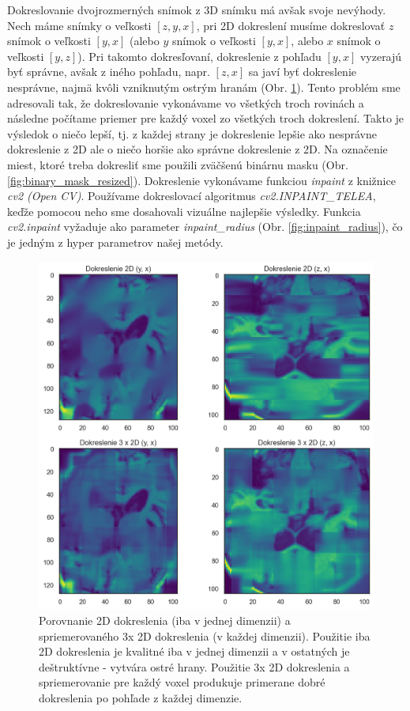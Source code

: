 Dokreslovanie dvojrozmerných snímok z 3D snímku má avšak svoje nevýhody. Nech máme snímky o veľkosti $[z, y, x]$, pri 2D dokreslení musíme dokreslovať $z$ snímok o veľkosti $[y, x]$ (alebo $y$ snímok o veľkosti $[y, x]$, alebo $x$ snímok o veľkosti $[y, z]$). Pri takomto dokresľovaní, dokreslenie z pohľadu $[y, x]$ vyzerajú byť správne, avšak z iného pohľadu, napr. $[z, x]$ sa javí byť dokreslenie nesprávne, najmä kvôli vzniknutým ostrým hranám (Obr. \ref{fig:inpaint_3x_2d}). Tento problém sme adresovali tak, že dokreslovanie vykonávame vo všetkých troch rovinách a následne počítame priemer pre každý voxel zo všetkých troch dokreslení. Takto je výsledok o niečo lepší, tj. z každej strany je dokreslenie lepšie ako nesprávne dokreslenie z 2D ale o niečo horšie ako správne dokreslenie z 2D. Na označenie miest, ktoré treba dokresliť sme použili zväčšenú binárnu masku (Obr. \ref{fig:binary_mask_resized}). Dokreslenie vykonávame funkciou \textit{inpaint} z knižnice \textit{cv2 (Open CV)}. Používame dokreslovací algoritmus \textit{cv2.INPAINT\_TELEA}, keďže pomocou neho sme dosahovali vizuálne najlepšie výsledky. Funkcia \textit{cv2.inpaint} vyžaduje ako parameter \textit{inpaint\_radius} (Obr. \ref{fig:inpaint_radius}), čo je jedným z hyper parametrov našej metódy.

\begin{figure}[H]
    \centering
    \includegraphics[width=13cm]{assets/images/inpaint_3x_2d.png}
    \caption{Porovnanie 2D dokreslenia (iba v jednej dimenzii) a spriemerovaného 3x 2D dokreslenia (v každej dimenzii). Použitie iba 2D dokreslenia je kvalitné iba v jednej dimenzii a v ostatných je deštruktívne - vytvára ostré hrany. Použitie 3x 2D dokreslenia a spriemerovanie pre každý voxel produkuje primerane dobré dokreslenia po pohľade z každej dimenzie.}
    \label{fig:inpaint_3x_2d}
\end{figure}

